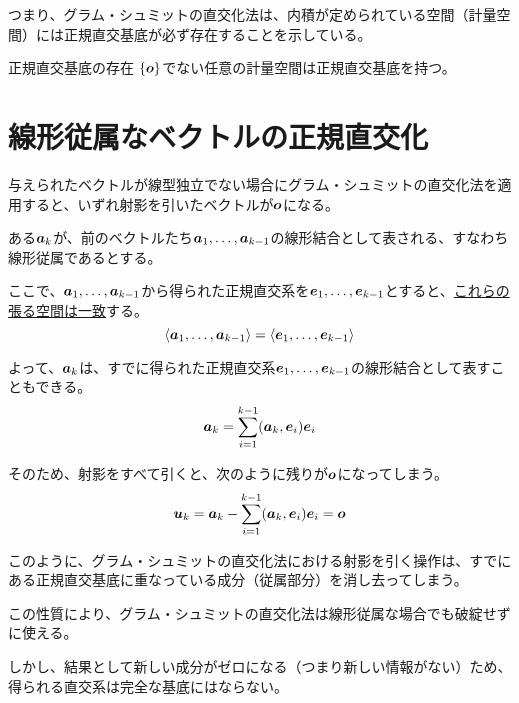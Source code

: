 \documentclass[../../../topic_linear-algebra]{subfiles}
\begin{document}
つまり、グラム・シュミットの直交化法は、内積が定められている空間（計量空間）には正規直交基底が必ず存在することを示している。

\begin{theorem*}{正規直交基底の存在}
  $\{\vb*{o}\}$でない任意の計量空間は正規直交基底を持つ。
\end{theorem*}

\sectionline
\section{線形従属なベクトルの正規直交化}\label{sec:gram-schmidt-with-dependent-vectors}

与えられたベクトルが線型独立でない場合にグラム・シュミットの直交化法を適用すると、いずれ射影を引いたベクトルが$\vb*{o}$になる。

\br

ある$\vb*{a}_k$が、前のベクトルたち$\vb*{a}_1,\ldots,\vb*{a}_{k-1}$の線形結合として表される、すなわち線形従属であるとする。

ここで、$\vb*{a}_1, \ldots, \vb*{a}_{k-1}$から得られた正規直交系を$\vb*{e}_1, \ldots, \vb*{e}_{k-1}$とすると、\hyperref[thm:gram-schmidt-span-invariance]{これらの張る空間は一致}する。
\begin{equation*}
  \langle \vb*{a}_1, \ldots, \vb*{a}_{k-1} \rangle = \langle \vb*{e}_1, \ldots, \vb*{e}_{k-1} \rangle
\end{equation*}

よって、$\vb*{a}_k$は、すでに得られた正規直交系$\vb*{e}_1,\ldots,\vb*{e}_{k-1}$の線形結合として表すこともできる。
\begin{equation*}
  \vb*{a}_k = \sum_{i = 1}^{k-1}(\vb*{a}_k, \vb*{e}_i) \vb*{e}_i
\end{equation*}

そのため、射影をすべて引くと、次のように残りが$\vb*{o}$になってしまう。
\begin{equation*}
  \vb*{u}_k = \vb*{a}_k - \sum_{i=1}^{k-1}(\vb*{a}_k, \vb*{e}_i) \vb*{e}_i = \vb*{o}
\end{equation*}

\br

このように、グラム・シュミットの直交化法における射影を引く操作は、すでにある正規直交基底に重なっている成分（従属部分）を消し去ってしまう。

この性質により、グラム・シュミットの直交化法は線形従属な場合でも破綻せずに使える。

\br

しかし、結果として新しい成分がゼロになる（つまり新しい情報がない）ため、得られる直交系は完全な基底にはならない。
\end{document}
